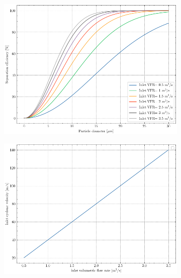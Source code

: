 \begin{figure}[H]
	\centering
	\begin{subfigure}{.49\textwidth}
		\centering
		\includegraphics[width=1.0\linewidth]{images/efficiency_vs_inlet_VFR.png}
		\caption{}
		\label{inlet_VRF}
	\end{subfigure}
	\begin{subfigure}{.49\textwidth}
		\centering
		\includegraphics[width=1.0\linewidth]{images/inlet_VRF_vs_inlet_velocity.png}
		\caption{}
		\label{inlet_velocity}
	\end{subfigure}
	\captionsetup{font=bf, size=small}
	\caption{ }
	\label{}
\end{figure}


